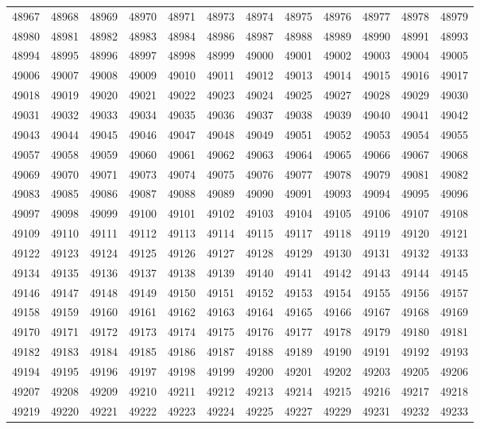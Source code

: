 \begin{center}
\begin{longtable}{llllllllllll}
48967 &48968 &48969 &48970 &48971 &48973 &48974 &48975 &48976 &48977 &48978 &48979 \\
48980 &48981 &48982 &48983 &48984 &48986 &48987 &48988 &48989 &48990 &48991 &48993 \\
48994 &48995 &48996 &48997 &48998 &48999 &49000 &49001 &49002 &49003 &49004 &49005 \\
49006 &49007 &49008 &49009 &49010 &49011 &49012 &49013 &49014 &49015 &49016 &49017 \\
49018 &49019 &49020 &49021 &49022 &49023 &49024 &49025 &49027 &49028 &49029 &49030 \\
49031 &49032 &49033 &49034 &49035 &49036 &49037 &49038 &49039 &49040 &49041 &49042 \\
49043 &49044 &49045 &49046 &49047 &49048 &49049 &49051 &49052 &49053 &49054 &49055 \\
49057 &49058 &49059 &49060 &49061 &49062 &49063 &49064 &49065 &49066 &49067 &49068 \\
49069 &49070 &49071 &49073 &49074 &49075 &49076 &49077 &49078 &49079 &49081 &49082 \\
49083 &49085 &49086 &49087 &49088 &49089 &49090 &49091 &49093 &49094 &49095 &49096 \\
49097 &49098 &49099 &49100 &49101 &49102 &49103 &49104 &49105 &49106 &49107 &49108 \\
49109 &49110 &49111 &49112 &49113 &49114 &49115 &49117 &49118 &49119 &49120 &49121 \\
49122 &49123 &49124 &49125 &49126 &49127 &49128 &49129 &49130 &49131 &49132 &49133 \\
49134 &49135 &49136 &49137 &49138 &49139 &49140 &49141 &49142 &49143 &49144 &49145 \\
49146 &49147 &49148 &49149 &49150 &49151 &49152 &49153 &49154 &49155 &49156 &49157 \\
49158 &49159 &49160 &49161 &49162 &49163 &49164 &49165 &49166 &49167 &49168 &49169 \\
49170 &49171 &49172 &49173 &49174 &49175 &49176 &49177 &49178 &49179 &49180 &49181 \\
49182 &49183 &49184 &49185 &49186 &49187 &49188 &49189 &49190 &49191 &49192 &49193 \\
49194 &49195 &49196 &49197 &49198 &49199 &49200 &49201 &49202 &49203 &49205 &49206 \\
49207 &49208 &49209 &49210 &49211 &49212 &49213 &49214 &49215 &49216 &49217 &49218 \\
49219 &49220 &49221 &49222 &49223 &49224 &49225 &49227 &49229 &49231 &49232 &49233 \\

\end{longtable}
\end{center}
